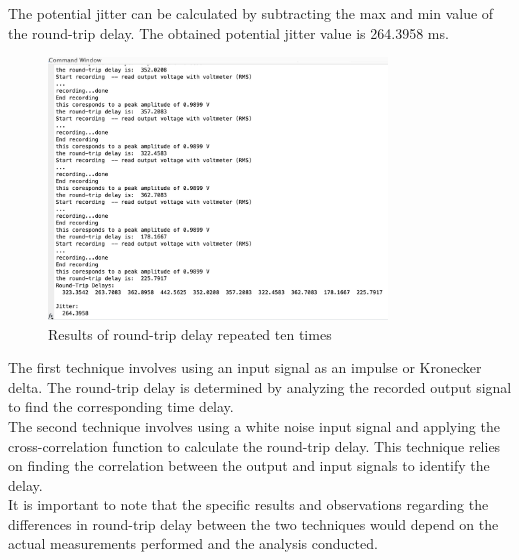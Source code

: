 \documentclass[
	a4paper,
	11pt,
]{article}
\begin{document}
The potential jitter can be calculated by subtracting the max and min value of the round-trip delay. The obtained potential jitter value is 264.3958 ms.
  
\begin{figure}[htb!]
    \centerline{\includegraphics[width=9cm]{4_img/4(b)_2.jpg}}
     \caption[ Results of round-trip delay repeated ten times ]
        {\small Results of round-trip delay repeated ten times }
\end{figure}
\indent

The first technique involves using an input signal as an impulse or Kronecker delta. The round-trip delay is determined by analyzing the recorded output signal to find the corresponding time delay.\\
The second technique involves using a white noise input signal and applying the cross-correlation function to calculate the round-trip delay. This technique relies on finding the correlation between the output and input signals to identify the delay.\\
It is important to note that the specific results and observations regarding the differences in round-trip delay between the two techniques would depend on the actual measurements performed and the analysis conducted. 
\end{document}
